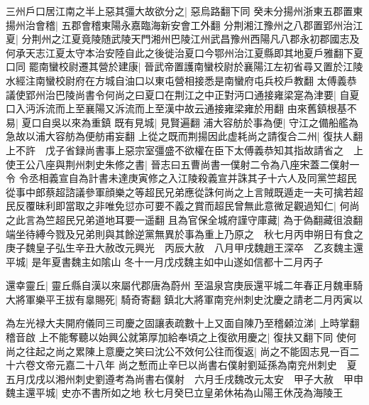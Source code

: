 三州戶口居江南之半上惡其彊大故欲分之|{
	惡烏路翻下同}
癸未分揚州浙東五郡置東揚州治會稽|{
	五郡會稽東陽永嘉臨海新安會工外翻}
分荆湘江豫州之八郡置郢州治江夏|{
	分荆州之江夏竟陵随武陵天門湘州巴陵江州武昌豫州西陽凡八郡永初郡國志及何承天志江夏太守本治安陸自此之後徙治夏口今鄂州治江夏縣即其地夏戶雅翻下夏口同}
罷南蠻校尉遷其營於建康|{
	晉武帝置護南蠻校尉於襄陽江左初省尋又置於江陵水經注南蠻校尉府在方城自油口以東屯營相接悉是南蠻府屯兵校戶教翻}
太傅義恭議使郢州治巴陵尚書令何尚之曰夏口在荆江之中正對沔口通接雍梁寔為津要|{
	自夏口入沔泝流而上至襄陽又泝流而上至漢中故云通接雍梁雍於用翻}
由來舊鎮根基不易|{
	夏口自吳以來為重鎮}
既有見城|{
	見賢遍翻}
浦大容舫於事為便|{
	守江之備船艦為急故以浦大容舫為便舫甫妄翻}
上從之既而荆揚因此虚耗尚之請復合二州|{
	復扶人翻}
上不許　戊子省録尚書事上惡宗室彊盛不欲權在臣下太傅義恭知其指故請省之　上使王公八座與荆州刺史朱修之書|{
	晉志曰五曹尚書一僕射二令為八座宋蓋二僕射一令}
令丞相義宣自為計書未達庚寅修之入江陵殺義宣并誅其子十六人及同黨竺超民從事中郎蔡超諮議參軍顔樂之等超民兄弟應從誅何尚之上言賊既遁走一夫可擒若超民反覆昧利即當取之非唯免愆亦可要不義之賞而超民曾無此意微足觀過知仁|{
	何尚之此言為竺超民兄弟道地耳要一遥翻}
且為官保全城府謹守庫藏|{
	為于偽翻藏徂浪翻}
端坐待縛今戮及兄弟則與其餘逆黨無異於事為重上乃原之　秋七月丙申朔日有食之　庚子魏皇子弘生辛丑大赦改元興光　丙辰大赦　八月甲戌魏趙王深卒　乙亥魏主還平城|{
	是年夏書魏主如隂山}
冬十一月戊戍魏主如中山遂如信都十二月丙子

還幸靈丘|{
	靈丘縣自漢以來屬代郡唐為蔚州}
至温泉宫庚辰還平城二年春正月魏車騎大將軍樂平王拔有辠賜死|{
	騎奇寄翻}
鎮北大將軍南兖州刺史沈慶之請老二月丙寅以

為左光禄大夫開府儀同三司慶之固讓表疏數十上又面自陳乃至稽顙泣涕|{
	上時掌翻稽音啟}
上不能奪聽以始興公就第厚加給奉頃之上復欲用慶之|{
	復扶又翻下同}
使何尚之往起之尚之累陳上意慶之笑曰沈公不效何公往而復返|{
	尚之不能固志見一百二十六卷文帝元嘉二十八年}
尚之慙而止辛巳以尚書右僕射劉延孫為南兖州刺史　夏五月戊戌以湘州刺史劉遵考為尚書右僕射　六月壬戌魏改元太安　甲子大赦　甲申魏主還平城|{
	史亦不書所如之地}
秋七月癸巳立皇弟休祐為山陽王休茂為海陵王

